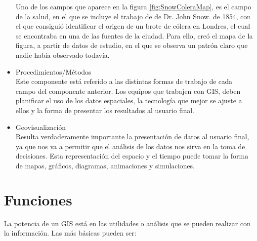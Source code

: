 \begin{itemize}
  Uno de los campos que aparece en la figura \ref{fig:SnowColeraMap}, es el campo de la salud, en el que se incluye el trabajo de de Dr. John Snow. de 1854, 
  con el que consiguió identificar el origen de un brote de cólera en Londres, el cual se encontraba en una de las fuentes de la ciudad.
  Para ello, creó el mapa de la figura, a partir de datos de estudio, en el que se observa un patrón claro que nadie había observado todavía.  
  
  \item Procedimientos/Métodos\\
  Este componente está referido a las distintas formas de trabajo de cada campo del componente anterior. 
  Los equipos que trabajen con GIS, deben planificar el uso de los datos espaciales, la tecnología que mejor se ajuste a ellos y la forma de presentar los resultados al usuario final.

  \item Geovisualización\\
  Resulta verdaderamente importante la presentación de datos al usuario final, ya que nos va a permitir que el análisis de los datos nos sirva en la toma de decisiones.
  Esta representación del espacio y el tiempo puede tomar la forma de mapas, gráficos, diagramas, animaciones y simulaciones.
\end{itemize}

\section{Funciones}
La potencia de un GIS está en las utilidades o análisis que se pueden realizar con la información. Las más básicas pueden ser:

